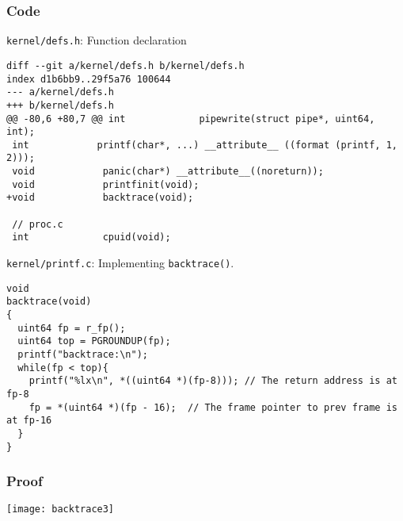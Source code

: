 \documentclass{article}
\begin{document}
\subsubsection*{Code}
\texttt{kernel/defs.h}: Function declaration
\begin{verbatim}
diff --git a/kernel/defs.h b/kernel/defs.h
index d1b6bb9..29f5a76 100644
--- a/kernel/defs.h
+++ b/kernel/defs.h
@@ -80,6 +80,7 @@ int             pipewrite(struct pipe*, uint64, int);
 int            printf(char*, ...) __attribute__ ((format (printf, 1, 2)));
 void            panic(char*) __attribute__((noreturn));
 void            printfinit(void);
+void            backtrace(void);
 
 // proc.c
 int             cpuid(void);
\end{verbatim}

\texttt{kernel/printf.c}: Implementing \texttt{backtrace()}.
\begin{verbatim}
void
backtrace(void)
{
  uint64 fp = r_fp();
  uint64 top = PGROUNDUP(fp);
  printf("backtrace:\n");
  while(fp < top){
    printf("%lx\n", *((uint64 *)(fp-8))); // The return address is at fp-8
    fp = *(uint64 *)(fp - 16);	// The frame pointer to prev frame is at fp-16
  }
}
\end{verbatim}

\subsubsection*{Proof}
\texttt{[image: backtrace3]}
\end{document}
